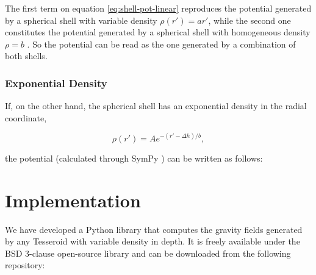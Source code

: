 \documentclass[extra]{gji}
\begin{document}
The first term on equation \ref{eq:shell-pot-linear} reproduces the potential generated by a spherical shell with variable density $\rho(r') = ar'$, while the second one constitutes the potential generated by a spherical shell with homogeneous density $\rho = b$ \citep{Mikuska2006,Grombein2013}.
So the potential can be read as the one generated by a combination of both shells.


\subsubsection{Exponential Density}

If, on the other hand, the spherical shell has an exponential density in the radial coordinate,

\begin{equation}
    \rho(r') = Ae^{-(r' - \Delta h)/b},
\end{equation}

\noindent the potential (calculated through SymPy \citep{sympy2017}) can be written as follows:



\section{Implementation}

We have developed a Python library that computes the gravity fields generated by any Tesseroid with variable density in depth.
It is freely available under the BSD 3-clause open-source library and can be downloaded from the following repository: 
\end{document}
